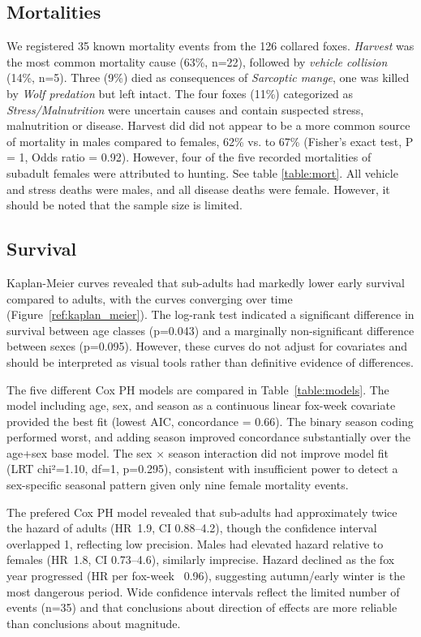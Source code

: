 \documentclass[12pt,a4paper,final,abstract=true,headings=small]{scrartcl}
\begin{document}
\subsection*{Mortalities}

We registered 35 known mortality events from the 126 collared foxes. \emph{Harvest} was the most common mortality cause (63\%, n=22), followed by \emph{vehicle collision } (14\%, n=5). Three (9\%) died as consequences of \emph{Sarcoptic mange},  one was killed by \emph{Wolf predation} but left intact. The four foxes (11\%) categorized as \emph{Stress/Malnutrition} were uncertain causes and contain suspected stress, malnutrition or disease. Harvest did
did not appear to be a more common source of mortality in males compared to females, 62\% vs. to 67\% (Fisher's exact test, P = 1, Odds ratio = 0.92). However, four of the five recorded mortalities of subadult females were attributed to hunting. See table \ref{table:mort}. All vehicle and stress deaths were males, and all disease deaths were female. However, it should be noted that the sample size is limited.



\subsection*{Survival}

Kaplan-Meier curves revealed that sub-adults had markedly lower early survival compared to adults, with the curves converging over time (Figure~\ref{ref:kaplan_meier}). The log-rank test indicated a significant difference in survival between age classes (p=0.043) and a marginally non-significant difference between sexes (p=0.095). However, these curves do not adjust for covariates and should be interpreted as visual tools rather than definitive evidence of differences.

The five different Cox PH models are compared in Table~\ref{table:models}. The model including age, sex,  and season as a continuous linear fox-week covariate provided the best fit (lowest AIC, concordance = 0.66). The binary season coding performed worst, and adding season improved concordance substantially over the age+sex base model. The sex $\times$ season interaction did not improve model fit (LRT chi²=1.10, df=1, p=0.295), consistent with insufficient power to detect a sex-specific seasonal pattern given only nine female mortality events.

The prefered Cox PH model revealed that sub-adults had approximately twice the hazard of adults (HR~1.9, CI 0.88–4.2), though the confidence interval overlapped 1, reflecting low precision. Males had elevated hazard relative to females (HR~1.8, CI 0.73–4.6), similarly imprecise. Hazard declined as the fox year progressed (HR per fox-week ~0.96), suggesting autumn/early winter is the most dangerous period. Wide confidence intervals reflect the limited number of events (n=35) and that conclusions about direction of effects are more reliable than conclusions about magnitude.
\end{document}
